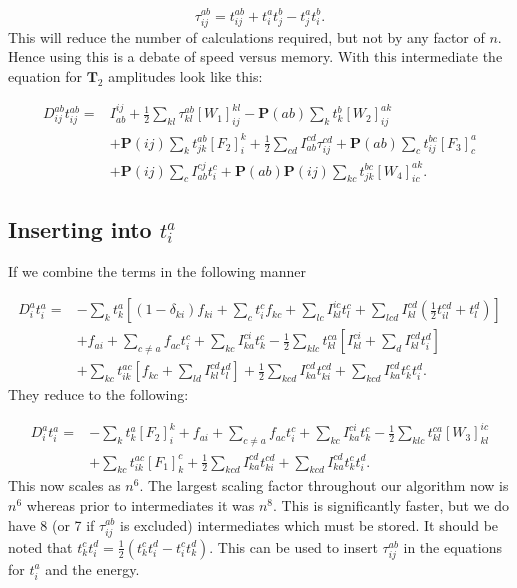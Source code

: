 \begin{equation}
\tau_{ij}^{ab} = t_{ij}^{ab} + t_i^a t_j^b - t_j^a t_i^b . \label{intermedtau}
\end{equation}
This will reduce the number of calculations required, but not by any factor of $n$. Hence using this is a debate of speed versus memory. With this intermediate the equation for $\textbf{T}_2$ amplitudes look like this:

\begin{align}
D_{ij}^{ab} t_{ij}^{ab} = & 
I_{ab}^{ij} +
\frac{1}{2} \sum_{kl} \tau_{kl}^{ab} [W_1]_{ij}^{kl}
- \textbf{P}(ab) \sum_k t_k^b [W_2]_{ij}^{ak}
\nonumber \\ &
+ \textbf{P}(ij) \sum_k t_{jk}^{ab} [F_2]_i^k
+ \frac{1}{2} \sum_{cd} I_{ab}^{cd} \tau_{ij}^{cd}
+ \textbf{P}(ab) \sum_c t_{ij}^{bc} [F_3]_c^a
\nonumber \\ &
+ \textbf{P}(ij) \sum_c I_{ab}^{cj} t_i^c
+ \textbf{P}(ab) \textbf{P}(ij) \sum_{kc} t_{jk}^{bc} [W_4]_{ic}^{ak} . \label{LINK_THIS_SHIT_1_T2}
\end{align}

\subsection{Inserting into $t_i^a$}

If we combine the terms in the following manner

\begin{align}
D_i^a t_i^a = &
- \sum_{k} t_k^a
\left[
(1 - \delta_{ki}) f_{ki}
+ \sum_c t_i^c
f_{kc}
+ \sum_{lc} I_{kl}^{ic} t_l^c
+ \sum_{lcd} I_{kl}^{cd} (\frac{1}{2} t_{il}^{cd} + t_l^d)
\right]
\nonumber \\ &
+ f_{ai} 
+ \sum_{c \not= a} f_{ac} t_i^c
+ \sum_{kc} I_{ka}^{ci} t_k^c 
- \frac{1}{2} \sum_{klc} t_{kl}^{ca}
\left[
I_{kl}^{ci} + \sum_d I_{kl}^{cd} t_i^d
\right]
\nonumber \\ &
+ \sum_{kc} t_{ik}^{ac} 
\left[
f_{kc} + \sum_{ld} I_{kl}^{cd} t_l^d
\right]
+ \frac{1}{2} \sum_{kcd} I_{ka}^{cd} t_{ki}^{cd} 
+ \sum_{kcd} I_{ka}^{cd} t_k^c t_i^d 
 .
\end{align}
They reduce to the following:

\begin{align}
D_i^a t_i^a = &
- \sum_{k} t_k^a
[F_2]_i^k
+ f_{ai} 
+ \sum_{c \not= a} f_{ac} t_i^c
+ \sum_{kc} I_{ka}^{ci} t_k^c 
- \frac{1}{2} \sum_{klc} t_{kl}^{ca} [W_3]_{kl}^{ic}
\nonumber \\ &
+ \sum_{kc} t_{ik}^{ac} [F_1]_k^c
+ \frac{1}{2} \sum_{kcd} I_{ka}^{cd} t_{ki}^{cd} 
+ \sum_{kcd} I_{ka}^{cd} t_k^c t_i^d 
 .
\end{align}
This now scales as $n^6$. The largest scaling factor throughout our algorithm now is $n^6$ whereas prior to intermediates it was $n^8$. This is significantly faster, but we do have 8 (or 7 if $\tau_{ij}^{ab}$ is excluded) intermediates which must be stored. It should be noted that $t_k^c t_i^d = \frac{1}{2} (t_k^c t_i^d - t_i^c t_k^d)$. This can be used to insert $\tau_{ij}^{ab}$ in the equations for $t_i^a$ and the energy. 

